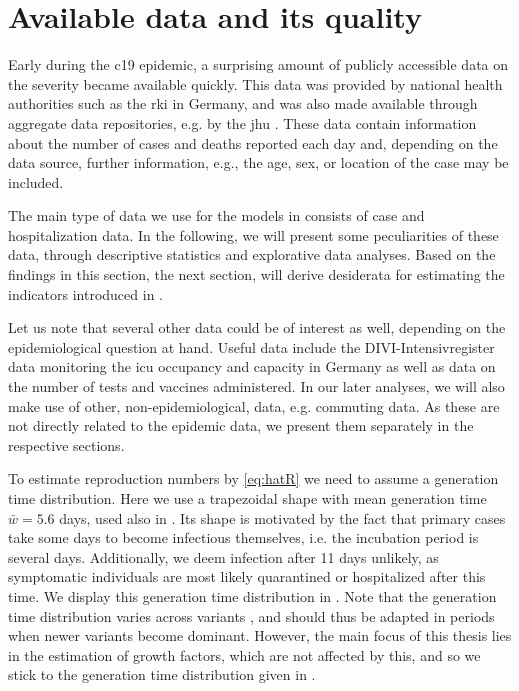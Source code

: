 \section{Available data and its quality}
\label{sec:data}

Early during the \gls{c19} epidemic, a surprising amount of publicly accessible data on the severity became available quickly. This data was provided by national health authorities such as the \acrfull{rki} in Germany, and was also made available through aggregate data repositories, e.g. by the \acrfull{jhu} \citep{Dong2020Interactive}. These data contain information about the number of cases and deaths reported each day and, depending on the data source, further information, e.g., the age, sex, or location of the case may be included.

The main type of data we use for the models in  consists of case and hospitalization data. In the following, we will present some peculiarities of these data, through descriptive statistics and explorative data analyses. Based on the findings in this section, the next section,  will derive desiderata for estimating the indicators introduced in .

Let us note that several other data could be of interest as well, depending on the epidemiological question at hand. Useful data include the DIVI-Intensivregister data monitoring the \gls{icu} occupancy and capacity in Germany as well as data on the number of tests and vaccines administered. In our later analyses, we will also make use of other, non-epidemiological, data, e.g. commuting data. As these are not directly related to the epidemic data, we present them separately in the respective sections.

To estimate reproduction numbers by \eqref{eq:hatR} we need to assume a generation time distribution. Here we use a trapezoidal shape with mean generation time $\bar w = 5.6$ days, used also in \citep{Burgard2021Regional}. Its shape is motivated by the fact that primary cases take some days to become infectious themselves, i.e. the incubation period is several days. Additionally, we deem infection after 11 days unlikely, as symptomatic individuals are most likely quarantined or hospitalized after this time. We display this generation time distribution in . Note that the generation time distribution varies across variants \citep{Hart2022Generationa}, and should thus be adapted in periods when newer variants become dominant. However, the main focus of this thesis lies in the estimation of growth factors, which are not affected by this, and so we stick to the generation time distribution given in .

